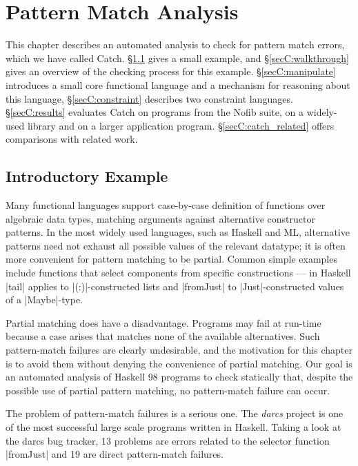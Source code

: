\chapter{Pattern Match Analysis}
\label{chp:catch}

This chapter describes an automated analysis to check for pattern match errors, which we have called Catch. \S\ref{secC:catch_intro} gives a small example, and \S\ref{secC:walkthrough} gives an overview of the checking process for this example. \S\ref{secC:manipulate} introduces a small core functional language and a mechanism for reasoning about this language, \S\ref{secC:constraint} describes two constraint languages. \S\ref{secC:results} evaluates Catch on programs from the Nofib suite, on a widely-used library and on a larger application program. \S\ref{secC:catch_related} offers comparisons with related work.


\section{Introductory Example}
\label{secC:catch_intro}

Many functional languages support case-by-case definition of functions
over algebraic data types, matching arguments against alternative
constructor patterns.  In the most widely used languages, such as Haskell
and ML, alternative patterns need not exhaust all possible values of
the relevant datatype; it is often more convenient for pattern matching
to be partial.  Common simple examples include functions that select
components from specific constructions --- in Haskell |tail| applies
to |(:)|-constructed lists and |fromJust| to |Just|-constructed values of
a |Maybe|-type.

Partial matching does have a disadvantage.  Programs may fail at run-time
because a case arises that matches none of the available alternatives.
Such pattern-match failures are clearly undesirable, and the motivation
for this chapter is to avoid them without denying the convenience of
partial matching.  Our goal is an automated analysis of Haskell 98 programs
to check statically that, despite the possible use of partial pattern
matching, no pattern-match failure can occur.

The problem of pattern-match failures is a serious one. The \textit{darcs} project \cite{darcs} is one of the most successful large scale programs written in Haskell. Taking a look at the darcs bug tracker, 13 problems are errors related to the selector function |fromJust| and 19 are direct pattern-match failures.

